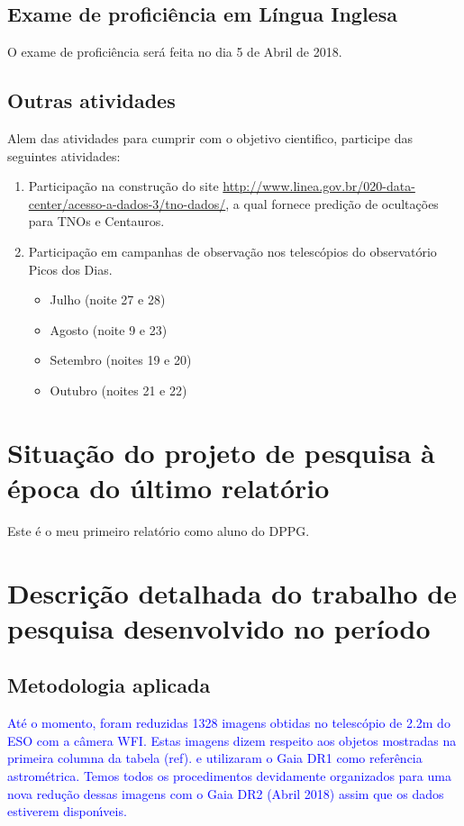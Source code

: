 \documentclass[a4paper, 11pt]{article}
\begin{document}
\subsection{Exame de profici\^encia em L\'ingua Inglesa}

O exame de proficiência será feita no dia 5 de Abril de 2018.

\subsection{Outras atividades}

Alem das atividades para cumprir com o objetivo cientifico, participe das seguintes atividades:

\begin{enumerate}
  \item Participação na construção do site \url{http://www.linea.gov.br/020-data-center/acesso-a-dados-3/tno-dados/}, a qual fornece predição de ocultações para TNOs e Centauros. 
  \item Participação em campanhas de observação nos telescópios do observatório Picos dos Dias. 
  \begin{itemize}
    \item Julho (noite 27 e 28)
    \item Agosto (noite 9 e 23) %
    \item Setembro (noites 19 e 20)
    \item Outubro (noites 21 e 22)
  \end{itemize}
\end{enumerate}
\section{Situação do projeto de pesquisa à época do último relatório}
Este é o meu primeiro relatório como aluno do DPPG.
\section{Descrição detalhada do trabalho de pesquisa desenvolvido no período}

\subsection{Metodologia aplicada}
\textcolor{blue}{At\'e o momento, foram reduzidas 1328 imagens obtidas no telesc\'opio de 2.2m do ESO com a c\^amera WFI. Estas imagens dizem respeito aos objetos mostradas na primeira columna da tabela (ref).  e utilizaram o Gaia DR1 como refer\^encia astrom\'etrica. Temos todos os procedimentos devidamente organizados para uma nova redu\c c\~ao dessas imagens com o Gaia DR2 (Abril 2018) assim que os dados estiverem dispon\'{\i}veis.}
\end{document}
